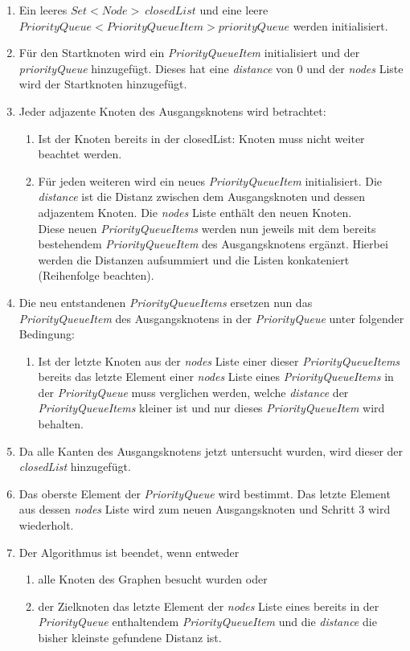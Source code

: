 \documentclass[a4paper]{article}
\begin{document}
\begin{enumerate}
    \item Ein leeres $Set<Node>\ closedList$ und eine leere $PriorityQueue<PriorityQueueItem> priorityQueue$ werden initialisiert.
    \item Für den Startknoten wird ein \textit{PriorityQueueItem} initialisiert und der \textit{priorityQueue} hinzugefügt. Dieses hat eine \textit{distance} von 0 und der \textit{nodes} Liste wird der Startknoten hinzugefügt.
    \item Jeder adjazente Knoten des Ausgangsknotens wird betrachtet:
    \begin{enumerate}
        \item Ist der Knoten bereits in der closedList: Knoten muss nicht weiter beachtet werden.
        \item Für jeden weiteren wird ein neues \textit{PriorityQueueItem} initialisiert. Die \textit{distance} ist die Distanz zwischen dem Ausgangsknoten und dessen adjazentem Knoten. Die \textit{nodes} Liste enthält den neuen Knoten.\\Diese neuen \textit{PriorityQueueItems} werden nun jeweils mit dem bereits bestehendem \textit{PriorityQueueItem} des Ausgangsknotens ergänzt. Hierbei werden die Distanzen aufsummiert und die Listen konkateniert (Reihenfolge beachten).
    \end{enumerate}
    \item Die neu entstandenen \textit{PriorityQueueItems} ersetzen nun das \textit{PriorityQueueItem} des Ausgangsknotens in der \textit{PriorityQueue} unter folgender Bedingung:
    \begin{enumerate}
         \item Ist der letzte Knoten aus der \textit{nodes} Liste einer dieser \textit{PriorityQueueItems} bereits das letzte Element einer \textit{nodes} Liste eines \textit{PriorityQueueItems} in der \textit{PriorityQueue} muss verglichen werden, welche \textit{distance} der \textit{PriorityQueueItems} kleiner ist und nur dieses \textit{PriorityQueueItem} wird behalten.
    \end{enumerate}
    \item Da alle Kanten des Ausgangsknotens jetzt untersucht wurden, wird dieser der \textit{closedList} hinzugefügt.
    \item Das oberste Element der \textit{PriorityQueue} wird bestimmt. Das letzte Element aus dessen \textit{nodes} Liste wird zum neuen Ausgangsknoten und Schritt 3 wird wiederholt.
    \item Der Algorithmus ist beendet, wenn entweder
    \begin{enumerate}
        \item alle Knoten des Graphen besucht wurden oder
        \item der Zielknoten das letzte Element der \textit{nodes} Liste eines bereits in der \textit{PriorityQueue} enthaltendem \textit{PriorityQueueItem} und die \textit{distance} die bisher kleinste gefundene Distanz ist.
    \end{enumerate}
\end{enumerate}
\end{document}
